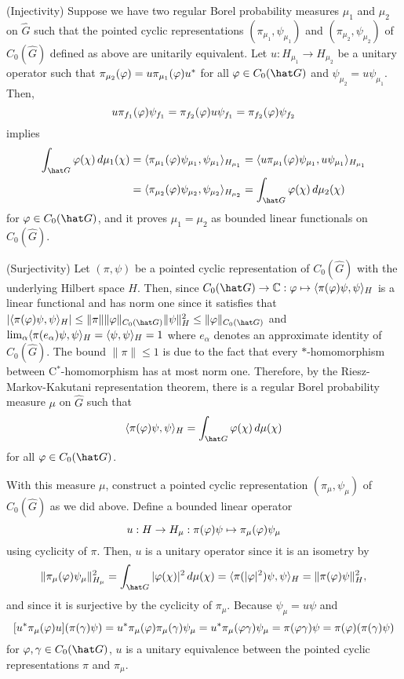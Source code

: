 \documentclass[a4paper]{article}
\begin{document}
\begin{pf}
(Injectivity)
Suppose we have two regular Borel probability measures $\mu_1$ and $\mu_2$ on $\hat G$ such that the pointed cyclic representations $(\pi_{\mu_1},\psi_{\mu_1})$ and $(\pi_{\mu_2},\psi_{\mu_2})$ of $C_0(\hat G)$ defined as above are unitarily equivalent.
Let $u:H_{\mu_1}\to H_{\mu_2}$ be a unitary operator such that $\pi_{\mu_2}(\varphi)=u\pi_{\mu_1}(\varphi)u^*$ for all $\f\in C_0(\hat G)$ and $\psi_{\mu_2}=u\psi_{\mu_1}$.
Then,
\[u\pi_{f_1}(\varphi)\psi_{f_1}=\pi_{f_2}(\varphi)u\psi_{f_1}=\pi_{f_2}(\varphi)\psi_{f_2}\]
implies
\begin{align*}
\int_{\hat G}\f(\chi)\,d\mu_1(\chi)&=\<\pi_{\mu_1}(\f)\psi_{\mu_1},\psi_{\mu_1}\>_{H_{\mu_1}}=\<u\pi_{\mu_1}(\f)\psi_{\mu_1},u\psi_{\mu_1}\>_{H_{\mu_1}}\\
&=\<\pi_{\mu_2}(\f)\psi_{\mu_2},\psi_{\mu_2}\>_{H_{\mu_2}}=\int_{\hat G}\f(\chi)\,d\mu_2(\chi)
\end{align*}
for $\f\in C_0(\hat G)$, and it proves $\mu_1=\mu_2$ as bounded linear functionals on $C_0(\hat G)$.

(Surjectivity)
Let $(\pi,\psi)$ be a pointed cyclic representation of $C_0(\hat G)$ with the underlying Hilbert space $H$.
Then, since $C_0(\hat G)\to\C:\f\mapsto\<\pi(\f)\psi,\psi\>_H$ is a linear functional and has norm one since it satisfies that $|\<\pi(\f)\psi,\psi\>_H|\le\|\pi\|\|\f\|_{C_0(\hat G)}\|\psi\|_H^2\le\|\f\|_{C_0(\hat G)}$ and $\lim_\alpha\langle\pi(e_\alpha)\psi,\psi\rangle_H=\langle\psi,\psi\rangle_H=1$ where $e_\alpha$ denotes an approximate identity of $C_0(\hat G)$.
The bound $\|\pi\|\le1$ is due to the fact that every $*$-homomorphism between C$^*$-homomorphism has at most norm one.
Therefore, by the Riesz-Markov-Kakutani representation theorem, there is a regular Borel probability measure $\mu$ on $\hat G$ such that
\[\<\pi(\f)\psi,\psi\>_H=\int_{\hat G}\f(\chi)\,d\mu(\chi)\]
for all $\f\in C_0(\hat G)$.

With this measure $\mu$, construct a pointed cyclic representation $(\pi_\mu,\psi_\mu)$ of $C_0(\hat G)$ as we did above.
Define a bounded linear operator
\[u:H\to H_\mu:\pi(\varphi)\psi\mapsto\pi_\mu(\varphi)\psi_\mu\]
using cyclicity of $\pi$.
Then, $u$ is a unitary operator since it is an isometry by
\[\|\pi_\mu(\f)\psi_\mu\|_{H_\mu}^2=\int_{\hat G}|\f(\chi)|^2\,d\mu(\chi)=\<\pi(|\f|^2)\psi,\psi\>_H=\|\pi(\f)\psi\|_H^2,\]
and since it is surjective by the cyclicity of $\pi_\mu$.
Because $\psi_\mu=u\psi$ and
\[[u^*\pi_\mu(\varphi)u](\pi(\gamma)\psi)=u^*\pi_\mu(\varphi)\pi_\mu(\gamma)\psi_\mu=u^*\pi_\mu(\varphi\gamma)\psi_\mu=\pi(\varphi\gamma)\psi=\pi(\varphi)(\pi(\gamma)\psi)\]
for $\f,\gamma\in C_0(\hat G)$, $u$ is a unitary equivalence between the pointed cyclic representations $\pi$ and $\pi_\mu$.
\end{pf}
\end{document}
